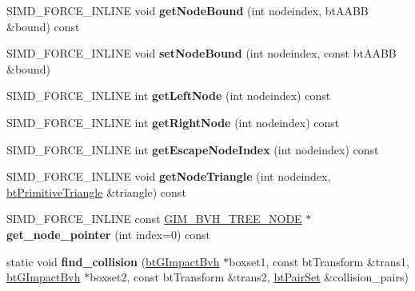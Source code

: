 \begin{DoxyCompactItemize}
\item 
\mbox{\label{classbtGImpactBvh_af517762c805e92b40344901e517d6375}} 
S\+I\+M\+D\+\_\+\+F\+O\+R\+C\+E\+\_\+\+I\+N\+L\+I\+NE void {\bfseries get\+Node\+Bound} (int nodeindex, bt\+A\+A\+BB \&bound) const
\item 
\mbox{\label{classbtGImpactBvh_a859ecdad42780d5eef09f9825f179640}} 
S\+I\+M\+D\+\_\+\+F\+O\+R\+C\+E\+\_\+\+I\+N\+L\+I\+NE void {\bfseries set\+Node\+Bound} (int nodeindex, const bt\+A\+A\+BB \&bound)
\item 
\mbox{\label{classbtGImpactBvh_abd3f4e49eae2c602d3bbdacffdee6afb}} 
S\+I\+M\+D\+\_\+\+F\+O\+R\+C\+E\+\_\+\+I\+N\+L\+I\+NE int {\bfseries get\+Left\+Node} (int nodeindex) const
\item 
\mbox{\label{classbtGImpactBvh_ae7eaa9f96db58dd4e04daaefb0b1f071}} 
S\+I\+M\+D\+\_\+\+F\+O\+R\+C\+E\+\_\+\+I\+N\+L\+I\+NE int {\bfseries get\+Right\+Node} (int nodeindex) const
\item 
\mbox{\label{classbtGImpactBvh_a4cbf39bfbc23194fe4d1c3e9f8206cb9}} 
S\+I\+M\+D\+\_\+\+F\+O\+R\+C\+E\+\_\+\+I\+N\+L\+I\+NE int {\bfseries get\+Escape\+Node\+Index} (int nodeindex) const
\item 
\mbox{\label{classbtGImpactBvh_a6c71b61d76c38653c94d4e3ef3d5fdf7}} 
S\+I\+M\+D\+\_\+\+F\+O\+R\+C\+E\+\_\+\+I\+N\+L\+I\+NE void {\bfseries get\+Node\+Triangle} (int nodeindex, \hyperlink{classbtPrimitiveTriangle}{bt\+Primitive\+Triangle} \&triangle) const
\item 
\mbox{\label{classbtGImpactBvh_afd2e90ddbfcfd48752e984462713c237}} 
S\+I\+M\+D\+\_\+\+F\+O\+R\+C\+E\+\_\+\+I\+N\+L\+I\+NE const \hyperlink{classGIM__BVH__TREE__NODE}{G\+I\+M\+\_\+\+B\+V\+H\+\_\+\+T\+R\+E\+E\+\_\+\+N\+O\+DE} $\ast$ {\bfseries get\+\_\+node\+\_\+pointer} (int index=0) const
\item 
\mbox{\label{classbtGImpactBvh_afae64cf5751011ae6f5e449fc6145ffd}} 
static void {\bfseries find\+\_\+collision} (\hyperlink{classbtGImpactBvh}{bt\+G\+Impact\+Bvh} $\ast$boxset1, const bt\+Transform \&trans1, \hyperlink{classbtGImpactBvh}{bt\+G\+Impact\+Bvh} $\ast$boxset2, const bt\+Transform \&trans2, \hyperlink{classbtPairSet}{bt\+Pair\+Set} \&collision\+\_\+pairs)
\end{DoxyCompactItemize}
